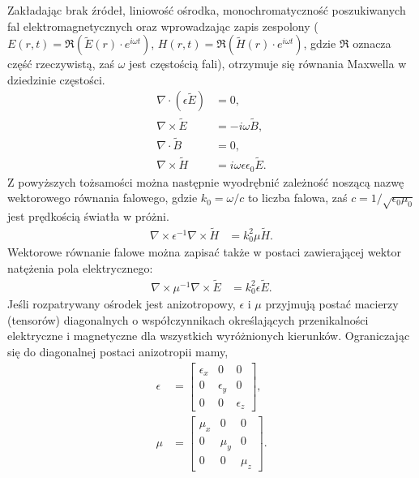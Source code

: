 \documentclass[12pt,a4paper]{article}
\begin{document}
Zakładając brak źródeł, liniowość ośrodka, monochromatyczność poszukiwanych fal
elektromagnetycznych oraz wprowadzając zapis zespolony ($E(r,t)=\Re(\tilde E(r)\cdot e^{i\omega t})$,
$H(r,t)=\Re(\tilde H(r)\cdot e^{i\omega t})$, gdzie $\Re$ oznacza część rzeczywistą, zaś $\omega$ jest częstością fali),
otrzymuje się równania Maxwella w dziedzinie częstości.
\begin{align}
\nabla\cdot(\epsilon\tilde E) &= 0, \tag{2.6a}\\
\nabla\times\tilde E &= -i\omega\tilde B, \tag{2.6b}\\
\nabla\cdot\tilde B &= 0, \tag{2.6c}\\
\nabla\times\tilde H &= i\omega\epsilon\epsilon_0\tilde E. \tag{2.6d}
\end{align}
Z powyższych tożsamości można następnie wyodrębnić zależność noszącą nazwę wektorowego
równania falowego, gdzie $k_0=\omega/c$ to liczba falowa, zaś $c=1/\sqrt{\epsilon_0\mu_0}$ jest prędkością światła w
próżni.
\begin{align}
\nabla\times\epsilon^{-1}\nabla\times\tilde H &= k_0^2\mu\tilde H. \tag{2.7a}
\end{align}
Wektorowe równanie falowe można zapisać także w postaci zawierającej wektor natężenia pola
elektrycznego:
\begin{align}
\nabla\times\mu^{-1}\nabla\times\tilde E &= k_0^2\epsilon\tilde E. \tag{2.7b}
\end{align}
Jeśli rozpatrywany ośrodek jest anizotropowy, $\epsilon$ i $\mu$ przyjmują postać macierzy (tensorów)
diagonalnych o współczynnikach określających przenikalności elektryczne i magnetyczne dla
wszystkich wyróżnionych kierunków. Ograniczając się do diagonalnej postaci anizotropii mamy,
\begin{align}
\epsilon &=
\begin{bmatrix}
\epsilon_x&0&0\\
0&\epsilon_y&0\\
0&0&\epsilon_z
\end{bmatrix}, \tag{2.8a}\\
\mu &=
\begin{bmatrix}
\mu_x&0&0\\
0&\mu_y&0\\
0&0&\mu_z
\end{bmatrix}. \tag{2.8b}
\end{align}
\end{document}
